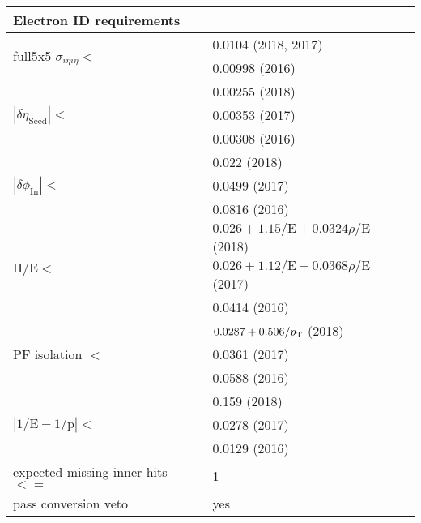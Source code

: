\begin{table}
\noindent \centering{}
\label{e_tight_id}
\begin{tabular}{ll}
\hline
Electron ID requirements\\
\hline 
\multirow{2}{*}{full5x5 $\sigma_{i\eta i\eta} <$}     & 0.0104 (2018, 2017)                \\
                                                     & 0.00998 (2016)                     \\[2mm]
\multirow{3}{*}{$|\delta\eta_{\mathrm{Seed}}| < $}     & 0.00255 (2018)                     \\
                                                     & 0.00353 (2017)                     \\
                                                     & 0.00308 (2016)                     \\[2mm]
\multirow{3}{*}{$|\delta\phi_{\mathrm{In}}| < $}       & 0.022 (2018)                       \\
                                                     & 0.0499 (2017)                      \\
                                                     & 0.0816 (2016)                      \\[2mm]
\multirow{3}{*}{$\mathrm{H/E} <$}                    & $0.026+1.15/\mathrm{E}+0.0324\rho/\mathrm{E}$ (2018)  \\
& $0.026+1.12/\mathrm{E}+0.0368\rho/\mathrm{E}$ (2017)  \\
& 0.0414 (2016)  \\[2mm]
\multirow{3}{*}{PF isolation $<$}  & $0.0287+0.506/p_{\mathrm{T}}$ (2018)         \\
                                                     & 0.0361 (2017)          \\
                                                     & 0.0588 (2016)          \\[2mm]
\multirow{3}{*}{$|1/\mathrm{E}-1/\mathrm{p}|<$}   & 0.159 (2018)              \\
                                                  & 0.0278 (2017)             \\
                                                  & 0.0129 (2016)             \\[2mm]
expected missing inner hits $<=$ & 1                            \\[2mm]
pass conversion veto	         & yes                          \\[2mm]
\hline
\end{tabular}
\end{table}